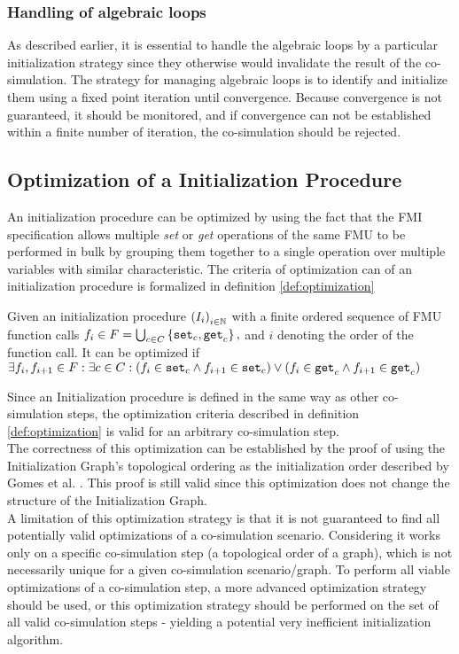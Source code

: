 
\subsubsection{Handling of algebraic loops}
As described earlier, it is essential to handle the algebraic loops by a particular initialization strategy since they otherwise would invalidate the result of the co-simulation. The strategy for managing algebraic loops is to identify and initialize them using a fixed point iteration until convergence. Because convergence is not guaranteed, it should be monitored, and if convergence can not be established within a finite number of iteration, the co-simulation should be rejected.

\subsection{Optimization of a Initialization Procedure}
An initialization procedure can be optimized by using the fact that the FMI specification allows multiple \textit{set} or \textit{get} operations of the same FMU to be performed in bulk by grouping them together to a single operation over multiple variables with similar characteristic. The criteria of optimization can of an initialization procedure is formalized in definition \ref{def:optimization}
\begin{definition}\label{def:optimization}
  Given an initialization procedure $ \left( I_i \right)_{i \in \mathbb{N}}$ with a finite ordered sequence of FMU function calls $f_i \in F = \bigcup_{c \in C}  \left\{ \mathtt{set}_{c},\mathtt{get}_{c} \right\},$ and $i$ denoting the order of the function call. It can be optimized if $\exists f_i, f_{i +1} \in F : \exists c \in C :(f_i \in {\mathtt{set}_{c}} \land f_{i+1} \in {\mathtt{set}_{c}}) \lor (f_i \in {\mathtt{get}_{c}} \land f_{i+1} \in {\mathtt{get}_{c}})$
\end{definition}
Since an Initialization procedure is defined in the same way as other co-simulation steps, the optimization criteria described in definition \ref{def:optimization} is valid for an arbitrary co-simulation step. \\
The correctness of this optimization can be established by the proof of using the Initialization Graph's topological ordering as the initialization order described by Gomes et al. \cite{Gomes2019}. This proof is still valid since this optimization does not change the structure of the Initialization Graph. \\
A limitation of this optimization strategy is that it is not guaranteed to find all potentially valid optimizations of a co-simulation scenario. Considering it works only on a specific co-simulation step (a topological order of a graph), which is not necessarily unique for a given co-simulation scenario/graph. To perform all viable optimizations of a co-simulation step, a more advanced optimization strategy should be used, or this optimization strategy should be performed on the set of all valid co-simulation steps - yielding a potential very inefficient initialization algorithm.

